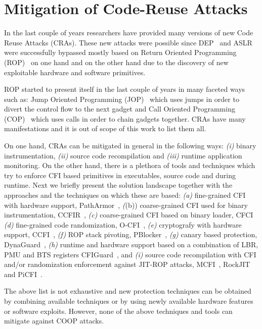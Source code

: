 \section{Mitigation of Code-Reuse Attacks}
\label{Mitigation of Code-Reuse Attacks}
In the last couple of years researchers have provided many versions of new Code Reuse Attacks (CRAs).
These new attacks were possible since DEP~\cite{dep} and ASLR~\cite{ASLR} were successfully bypassed mostly based
on Return Oriented Programming (ROP)~\cite{ROP, kornau:rop, rop:shacham} on one hand and on 
the other hand due to the discovery of new exploitable hardware and software primitives.

ROP started to present itself in the last couple of years in many faceted ways such as:
Jump Oriented Programming (JOP)~\cite{JOP1, JOP2, JOP3} which uses jumps in order to divert the control flow to the next gadget and 
Call Oriented Programming (COP)~\cite{rop:carlini} which uses calls in order to chain gadgets together.
CRAs have many manifestations and it is out of scope of this work to list them all.

On one hand, CRAs can be mitigated in general in the following ways: 
\textit{(i)} binary instrumentation,
\textit{(ii)} source code recompilation and 
\textit{(iii)} runtime application monitoring.
On the other hand, there is a plethora of tools and techniques which try to enforce CFI based
primitives in executables, source code and during runtime. Next we briefly
present the solution landscape together with the approaches and the techniques on which these are based:
\textit{(a)} fine-grained CFI with hardware support, PathArmor~\cite{veen:cfi},
\textit((b)) coarse-grained CFI used for binary instrumentation, CCFIR~\cite{ccfir:zhang},
\textit{(c)} coarse-grained CFI based on binary loader, CFCI~\cite{cfci:zhang}
\textit{(d)} fine-grained code randomization, O-CFI~\cite{mohan:opaque},
\textit{(e)} cryptografy with hardware support, CCFI~\cite{ccfi:jose},
\textit{(f)} ROP stack pivoting, PBlocker~\cite{pblocker:prakash},
\textit{(g)} canary based protection, DynaGuard~\cite{dynaguard:petsios},
\textit{(h)} runtime and hardware support based on a combination of LBR, PMU and BTS registers CFIGuard~\cite{cfiguard:yuan}, and
\textit{(i)} source code recompilation with CFI and/or randomization enforcement against JIT-ROP attacks, MCFI~\cite{mcfi:niu}, 
RockJIT~\cite{rockjit:niu} and PiCFI~\cite{perinput:niu}.

The above list is not exhaustive and new protection techniques can be obtained by combining available techniques
or by using newly available hardware features or software exploits. However, none of the above techniques and tools 
can mitigate against COOP attacks.


